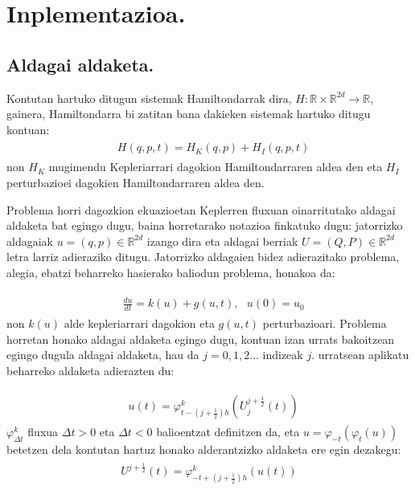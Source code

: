\section{Inplementazioa.}

\subsection*{Aldagai aldaketa.}

Kontutan hartuko ditugun sistemak Hamiltondarrak dira, $H: \mathbb{R} \times \mathbb{R}^{2d} \longrightarrow \mathbb{R}$, gainera, Hamiltondarra bi zatitan bana dakieken sistemak hartuko ditugu kontuan:
\begin{align}
\begin{split}
&H(q,p,t)=H_K(q,p)+H_I(q,p,t)
\end{split}
\end{align} 
non $H_K$ mugimendu Kepleriarrari dagokion Hamiltondarraren aldea den eta $H_I$ perturbazioei dagokien Hamiltondarraren aldea den.

Problema horri dagozkion ekuazioetan Keplerren fluxuan oinarritutako aldagai aldaketa bat egingo dugu, baina horretarako notazioa finkatuko dugu: jatorrizko aldagaiak $u=(q,p) \in \mathbb{R}^{2d}$ izango dira eta aldagai berriak $U=(Q,P) \in \mathbb{R}^{2d}$ letra larriz adieraziko ditugu. Jatorrizko aldagaien bidez adierazitako problema, alegia, ebatzi beharreko hasierako baliodun problema, honakoa da:

\begin{align}
\begin{split}
\label{eq: HamEDA}
&\frac{du}{dt} = k(u) + g(u,t),\ \ \ u(0) = u_0
\end{split}
\end{align} 
non $k(u)$ alde kepleriarrari dagokion eta $g(u,t)$ perturbazioari. 
Problema horretan honako aldagai aldaketa egingo dugu, kontuan izan urrats bakoitzean egingo dugula aldagai aldaketa, hau da $j=0, 1, 2 \ldots$ indizeak $j$. urratsean aplikatu beharreko aldaketa adierazten du:

\begin{align}
\begin{split}
\label{eq: uUaldaketa}
&u(t) = \varphi_{t-(j+\frac{1}{2})h}^k\left(U_j^{j+\frac{1}{2}}(t)\right)
\end{split}
\end{align} 
$\varphi_{\Delta t}^k$ fluxua $\Delta t>0$ eta $\Delta t <0$ balioentzat definitzen da, eta  $u= \varphi_{-t}(\varphi_{t}(u))$ betetzen dela kontutan hartuz honako alderantzizko aldaketa ere egin dezakegu:
\begin{align}
\begin{split}
\label{eq: Uualdaketa}
U^{j+\frac{1}{2}}(t) = \varphi^k_{-t+(j+\frac{1}{2})h} \left( u(t) \right)
\end{split}
\end{align} 

